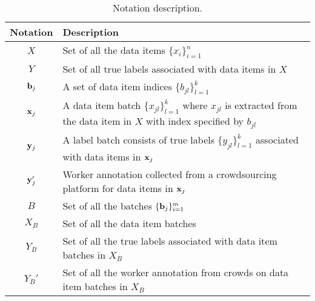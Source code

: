 


\begin{table}[!t]
\centering
 {\caption{Notation description.}\label{tab:notation}}
{
  \begin{tabular}{@{}c@{}||p{6.8cm}}
  \hline    
  Notation & Description \\ \hline \hline
  $X$      & Set of all the data items $\{x_i\}_{i=1}^n$  \\ \hline
  $Y$      & Set of all true labels associated with data items in $X$ \\ \hline
  ${\mathbf{b}}_j$    & A set of data item indices $\{b_{jl}\}_{l=1}^{k}$ \\ \hline
  ${\mathbf{x}}_j$    & A data item batch $\{x_{jl}\}_{l=1}^{k}$ where $x_{jl}$ is extracted from the data item in $X$ with index specified by $b_{jl}$ \\ \hline
  ${\mathbf{y}}_j$    & A label batch consists of true labels $\{y_{jl}\}_{l=1}^{k}$ associated with data items in ${\mathbf{x}}_j$ \\ \hline
  ${\mathbf{y}}_j'$   & Worker annotation collected from a crowdsourcing platform for data items in ${\mathbf{x}}_j$ \\ \hline
  $B$      & Set of all the batches $\{{\mathbf{b}}_j\}_{i=1}^m$ \\ \hline
  $X_B$    & Set of all the data item batches \\ \hline
  $Y_B$    & Set of all the true labels associated with data item batches in $X_B$ \\ \hline
  $Y_B'$   & Set of all the worker annotation from crowds on data item batches in $X_B$ \\ \hline
  \end{tabular}
}
\end{table}
